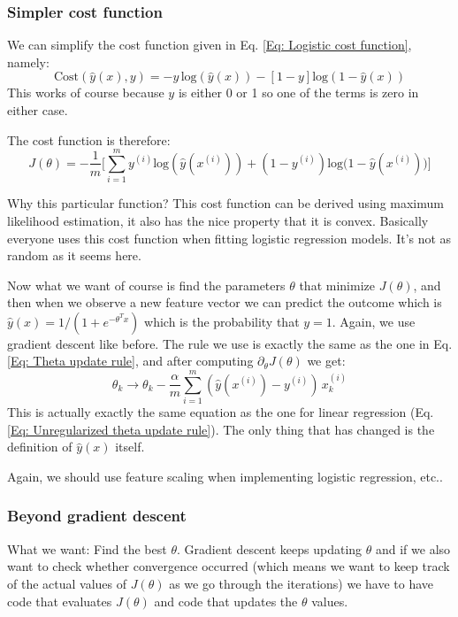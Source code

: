 \documentclass[a4paper, 10pt,hidelinks]{article}
\newcommand{\ind}[1]{^{(#1)}}
\begin{document}
\subsubsection{Simpler cost function}
We can simplify the cost function given in Eq. \eqref{Eq: Logistic cost function}, namely:
\begin{equation}\label{Eq: Logistic final cost function 2 classes}
\text{Cost}(\hat{y}(x), y) = - y\, \text{log}(\hat{y}(x)) - \left[1 - y\right] \text{log} (1 - \hat{y}(x))
\end{equation}
This works of course because $y$ is either 0 or 1 so one of the terms is zero in either case. 

The cost function is therefore:
\begin{equation}\label{Eq: Final Final logistic cost function}
J(\theta) = - \frac{1}{m} \Big[ \sum_{i = 1}^m y\ind{i} \text{log} (\hat{y}(x\ind{i})) + (1 - y\ind{i}) \text{log} \Big(1 - \hat{y}(x\ind{i})\Big) \Big]
\end{equation}

Why this particular function? This cost function can be derived using maximum likelihood estimation, it also has the nice property that it is convex. Basically everyone uses this cost function when fitting logistic regression models. It's not as random as it seems here.

Now what we want of course is find the parameters $\theta$ that minimize $J(\theta)$, and then when we observe a new feature vector we can predict the outcome which is $\hat{y}(x) = 1/(1 + e^{- \theta^T x})$ which is the probability that $y = 1$. Again, we use gradient descent like before. The rule we use is exactly the same as the one in Eq. \eqref{Eq: Theta update rule}, and after computing $\partial_{\theta} J(\theta)$ we get:
\begin{equation}\label{Eq: Theta update logistic unregularized}
\theta_k \rightarrow \theta_k - \frac{\alpha}{m} \sum_{i = 1}^m (\hat{y}(x\ind{i}) - y\ind{i})\, x_k\ind{i}
\end{equation}
This is actually exactly the same equation as the one for linear regression (Eq. \eqref{Eq: Unregularized theta update rule}). The only thing that has changed is the definition of $\hat{y}(x)$ itself. 

Again, we should use feature scaling when implementing logistic regression, etc.. 


\subsubsection{Beyond gradient descent}
What we want: Find the best $\theta$. Gradient descent keeps updating $\theta$ and if we also want to check whether convergence occurred (which means we want to keep track of the actual values of $J(\theta)$ as we go through the iterations) we have to have code that evaluates $J(\theta)$ and code that updates the $\theta$ values. 
\end{document}
